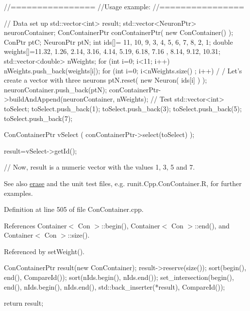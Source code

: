 \begin{DoxyCode}
        //================
        //Usage example:
        //================

        // Data set up
                std::vector<int> result;
                std::vector<NeuronPtr> neuronContainer;
                ConContainerPtr conContainerPtr( new ConContainer() );
                ConPtr  ptC;
                NeuronPtr ptN;
                int ids[]= {11, 10, 9, 3, 4, 5, 6, 7, 8, 2, 1};
                double weights[]={11.32, 1.26, 2.14, 3.16, 4.14, 5.19, 6.18, 7.16
      , 8.14, 9.12, 10.31};
                std::vector<double> nWeights;
                for (int i=0; i<11; i++) {
                        nWeights.push_back(weights[i]);
                }
                for (int i=0; i<nWeights.size() ; i++) {                                /
      / Let's create a vector with three neurons
                        ptN.reset( new Neuron( ids[i] ) );
                        neuronContainer.push_back(ptN);
                }
                conContainerPtr->buildAndAppend(neuronContainer, nWeights);
                // Test
                std::vector<int> toSelect;
                toSelect.push_back(1);
                toSelect.push_back(3);
                toSelect.push_back(5);
                toSelect.push_back(7);

                ConContainerPtr  vSelect (  conContainerPtr->select(toSelect)  );
      
                result=vSelect->getId();

                // Now, result is a numeric vector with the values 1, 3, 5 and 7.
      
\end{DoxyCode}


\begin{DoxySeeAlso}{See also}
\hyperlink{class_con_container_a9665acde2f526ae4207b919c90615fe5}{erase} and the unit test files, e.g. runit.Cpp.ConContainer.R, for further examples. 
\end{DoxySeeAlso}


Definition at line 505 of file ConContainer.cpp.



References Container$<$ Con $>$::begin(), Container$<$ Con $>$::end(), and Container$<$ Con $>$::size().



Referenced by setWeight().


\begin{DoxyCode}
{
  ConContainerPtr result(new ConContainer);
  result->reserve(size());
  sort(begin(), end(), CompareId());
  sort(nIds.begin(), nIds.end());
  set_intersection(begin(), end(), nIds.begin(), nIds.end(),
      std::back_inserter(*result), CompareId());

  return result;
}
\end{DoxyCode}


